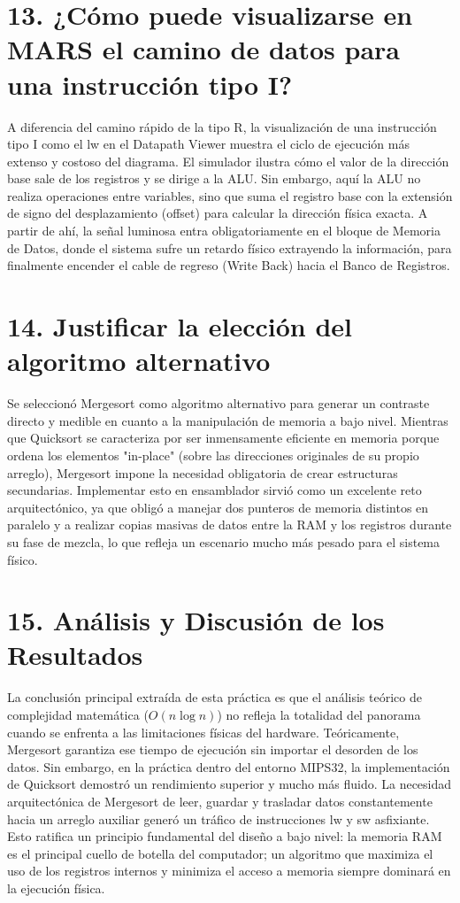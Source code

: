 \documentclass[12pt,a4paper]{article}
\begin{document}
\section*{13. ¿Cómo puede visualizarse en MARS el camino de datos para una instrucción tipo I?}
A diferencia del camino rápido de la tipo R, la visualización de una instrucción tipo I como el lw en el Datapath Viewer muestra el ciclo de ejecución más extenso y costoso del diagrama. El simulador ilustra cómo el valor de la dirección base sale de los registros y se dirige a la ALU. Sin embargo, aquí la ALU no realiza operaciones entre variables, sino que suma el registro base con la extensión de signo del desplazamiento (offset) para calcular la dirección física exacta. A partir de ahí, la señal luminosa entra obligatoriamente en el bloque de Memoria de Datos, donde el sistema sufre un retardo físico extrayendo la información, para finalmente encender el cable de regreso (Write Back) hacia el Banco de Registros.

\section*{14. Justificar la elección del algoritmo alternativo}
Se seleccionó Mergesort como algoritmo alternativo para generar un contraste directo y medible en cuanto a la manipulación de memoria a bajo nivel. Mientras que Quicksort se caracteriza por ser inmensamente eficiente en memoria porque ordena los elementos "in-place" (sobre las direcciones originales de su propio arreglo), Mergesort impone la necesidad obligatoria de crear estructuras secundarias. Implementar esto en ensamblador sirvió como un excelente reto arquitectónico, ya que obligó a manejar dos punteros de memoria distintos en paralelo y a realizar copias masivas de datos entre la RAM y los registros durante su fase de mezcla, lo que refleja un escenario mucho más pesado para el sistema físico.

\section*{15. Análisis y Discusión de los Resultados}
La conclusión principal extraída de esta práctica es que el análisis teórico de complejidad matemática ($O(n \log n)$) no refleja la totalidad del panorama cuando se enfrenta a las limitaciones físicas del hardware. Teóricamente, Mergesort garantiza ese tiempo de ejecución sin importar el desorden de los datos. Sin embargo, en la práctica dentro del entorno MIPS32, la implementación de Quicksort demostró un rendimiento superior y mucho más fluido. La necesidad arquitectónica de Mergesort de leer, guardar y trasladar datos constantemente hacia un arreglo auxiliar generó un tráfico de instrucciones lw y sw asfixiante. Esto ratifica un principio fundamental del diseño a bajo nivel: la memoria RAM es el principal cuello de botella del computador; un algoritmo que maximiza el uso de los registros internos y minimiza el acceso a memoria siempre dominará en la ejecución física.
\end{document}
